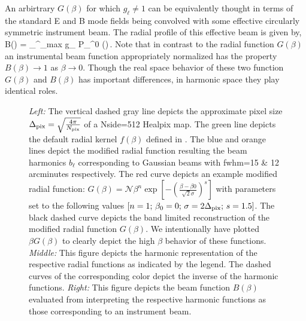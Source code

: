 An arbirtrary $G(\beta)$ for which $g_{\ell} \neq 1$ can be equivalently thought in terms of the standard E and B mode fields being convolved with some effective circularly symmetric instrument beam. The radial profile of this effective beam is given by,
%
\beq
B(\beta) = \sum_{}^{\ell_{\rm max}}  g_{\ell} P_{\ell}^{0} (\cos{\beta})\,.
\eeq
%
Note that in contrast to the radial function $G(\beta)$ an instrumental beam function appropriately normalized has the property $B(\beta) \rightarrow 1$ as $\beta \rightarrow 0$. Though the real space behavior of these two function $G(\beta)$ and $B(\beta)$ has important differences, in harmonic space they play identical roles.
%
\begin{figure}[!t] 
\centering
{}
\caption{\textit{Left:} The vertical dashed gray line depicts the approximate pixel size $\Delta_{\rm pix} = \sqrt{\frac{4 \pi}{N_{\rm pix}}}$ of a Nside=512 Healpix map. The green line depicts the default radial kernel $f(\beta)$ defined in . The blue and orange lines depict the modified radial function resulting the beam harmonics $b_{\ell}$ corresponding to Gaussian beams with fwhm=15 \& 12 arcminutes respectively. The red curve depicts an example modified radial function: $G(\beta)=\mathcal{N} \beta^n \exp{\left[ -\left( \frac{\beta-\beta0}{\sqrt{2} \sigma} \right)^s \right]}$ with parameters set to the following values $[n=1;\, \beta_0=0 ;\, \sigma = 2\Delta_{\rm pix} ;\, s=1.5]$. The black dashed curve depicts the band limited reconstruction of the modified radial function $G(\beta)$. We intentionally have plotted $\beta G(\beta)$ to clearly depict the high $\beta$ behavior of these functions. \textit{Middle: } This figure depicts the harmonic representation of the respective radial functions as indicated by the legend. The dashed curves of the corresponding color depict the inverse of the harmonic functions. \textit{Right:} This figure depicts the beam function $B(\beta)$ evaluated from interpreting the respective harmonic functions as those corresponding to an instrument beam.}
\label{fig:example_gbeta}
\end{figure}
%

